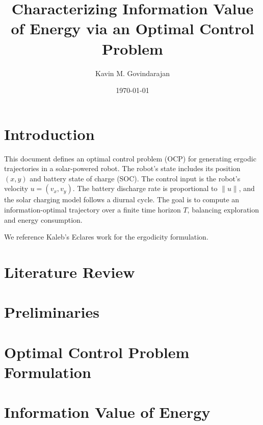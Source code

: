 \documentclass{article}
\title{Characterizing Information Value of Energy via an Optimal Control Problem}
\author{Kavin M. Govindarajan}
\date{\today}
\begin{document}
\maketitle

\section{Introduction}
This document defines an optimal control problem (OCP) for generating ergodic trajectories in a solar-powered robot. The robot's state includes its position $(x, y)$ and battery state of charge (SOC). The control input is the robot's velocity $u = (v_x, v_y)$. The battery discharge rate is proportional to $\|u\|$, and the solar charging model follows a diurnal cycle. The goal is to compute an information-optimal trajectory over a finite time horizon $T$, balancing exploration and energy consumption.

We reference Kaleb's Eclares work \cite{naveedEclaresEnergyAwareClarityDriven2024} for the ergodicity formulation.

\section{Literature Review}


\section{Preliminaries}


\section{Optimal Control Problem Formulation}


\section{Information Value of Energy}




\end{document}
